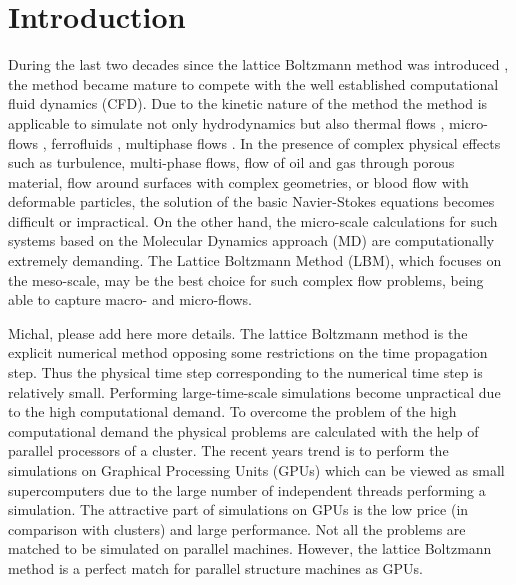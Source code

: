 \documentclass[mathpazo]{cicp}
\begin{document}


\maketitle


\section{Introduction}
\label{sec:introduction}
During the last two decades since the lattice Boltzmann method was introduced \cite{mcnamara}, the method became mature to compete with the well established computational fluid dynamics (CFD). Due to the kinetic nature of the method the method is applicable to simulate not only hydrodynamics but also thermal flows \cite{karlin-minimalmodels,yuan-thermal}, micro-flows \cite{ansumali-small-knudsen}, ferrofluids \cite{rosensweig,kuzmin-aniso}, multiphase flows \cite{rothman-color,Shan-chen:extended,swift}. In the presence of complex physical effects such as turbulence, multi-phase flows, flow of oil and gas through porous material, flow around surfaces with complex geometries, or blood flow with deformable particles, the solution of the basic Navier-Stokes equations becomes difficult or impractical. On the other hand, the micro-scale calculations for such systems based on the  Molecular Dynamics approach (MD) are computationally extremely demanding.  The Lattice Boltzmann Method (LBM), which focuses on the meso-scale, may be the best choice for such complex flow problems, being able to capture macro- and micro-flows.

{\color{red} Michal, please add here more details.}
The lattice Boltzmann method is the explicit numerical method opposing some restrictions on the time propagation step. Thus the physical time step corresponding to the numerical time step is relatively small. Performing large-time-scale simulations become unpractical due to the high computational demand. To overcome the problem of the high computational demand the physical problems are calculated with the help of parallel processors of a cluster. The recent years trend is to perform the simulations on Graphical Processing Units (GPUs) which can be viewed as small supercomputers due to the large number of independent threads performing a simulation. The attractive part of simulations on GPUs is the low price (in comparison with clusters) and large performance. Not all the problems are matched to be simulated on parallel machines. However, the lattice Boltzmann method is a perfect match for parallel structure machines as GPUs. 
\end{document}
